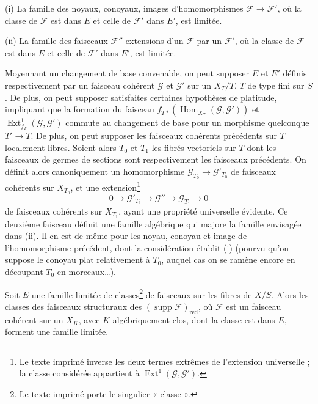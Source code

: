 \medskip
\noindent (i) La famille des noyaux, conoyaux, images d'homomorphismes
$\mathcal F\longrightarrow\mathcal F'$, où la classe de $\mathcal F$ est dans
$E$ et celle de $\mathcal F'$ dans $E'$, est limitée.

\smallskip
\noindent (ii) La famille des faisceaux $\mathcal F''$ extensions d'un
$\mathcal F$ par un $\mathcal F'$, où la classe de $\mathcal F$ est dans $E$
et celle de $\mathcal F'$ dans $E'$, est limitée.

Moyennant un changement de base convenable, on peut supposer $E$ et $E'$
définis respectivement par un faisceau cohérent $\mathcal G$ et $\mathcal G'$
sur un $X_T/T$, $T$ de type fini sur $S$. De plus, on peut supposer satisfaites
certaines hypothèses de platitude, impliquant que la formation du faisceau
$f_{T*}(\operatorname{Hom}_{X_T}(\mathcal G,\mathcal G'))$ et
$\operatorname{Ext}^{1}_{f_T}(\mathcal G,\mathcal G')$ commute au changement
de base pour un morphisme quelconque $T'\longrightarrow T$. De plus, on peut
supposer les faisceaux cohérents précédents sur $T$ localement libres. Soient
alors $T_0$ et $T_1$ les fibrés vectoriels sur $T$ dont les faisceaux de germes
de sections sont respectivement les faisceaux précédents. On définit alors
canoniquement un homomorphisme
$\mathcal G_{T_0}\longrightarrow\mathcal G'_{T_0}$ de faisceaux cohérents sur
$X_{T_0}$, et une extension\footnote{Le texte imprimé inverse les deux termes extrêmes de l'extension universelle ; la classe considérée appartient à $\operatorname{Ext}^1(\mathcal G,\mathcal G')$.}
\[
0\longrightarrow\mathcal G'_{T_1}\longrightarrow\mathcal G''
\longrightarrow\mathcal G_{T_1}\longrightarrow0
\]
de faisceaux cohérents sur $X_{T_1}$, ayant une propriété universelle évidente.
Ce deuxième faisceau définit une famille algébrique qui majore la famille
envisagée dans (ii). Il en est de même pour les noyau, conoyau et image de
l'homomorphisme
précédent, dont la considération établit (i) (pourvu qu'on suppose le conoyau
plat relativement à $T_0$, auquel cas on se ramène encore en découpant $T_0$ en
morceaux\ldots).

 Soit $E$ une famille limitée de classes\footnote{Le texte imprimé porte le singulier « classe ».} de faisceaux
sur les fibres de $X/S$. Alors les classes des faisceaux structuraux des
$(\operatorname{supp}\mathcal F)_{\mathrm{réd}}$, où $\mathcal F$ est un
faisceau cohérent sur un $X_K$, avec $K$ algébriquement clos, dont la classe est
dans $E$, forment une famille limitée.

